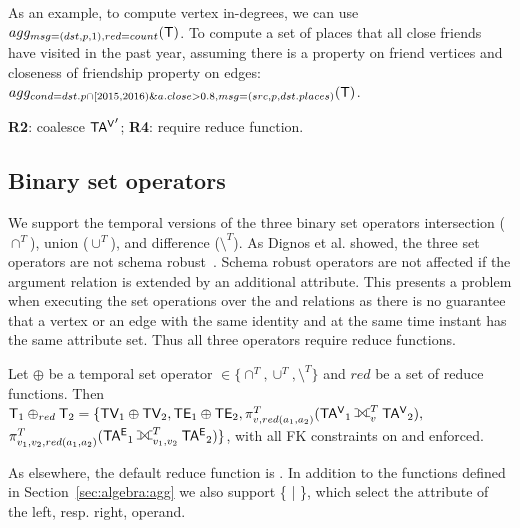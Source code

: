 As an example, to compute vertex in-degrees, we can use
$agg_{msg=(dst,p,1),red=count}(\mathsf{T})$.  To compute a set of places
that all close friends have visited in the past year, assuming there
is a property  on friend vertices and closeness of
friendship property on edges:\\ $agg_{cond=dst.p \cap [2015,2016) \&
    a.close > 0.8,msg=(src,p,dst.places)}(\mathsf{T})$.

{\bf R2}: coalesce $\mathsf{TA^{V}}'$; {\bf R4}: require reduce function.


\subsection{Binary set operators}
\label{sec:algebra:binary}

We support the temporal versions of the three binary set operators
intersection ($\cap^T$), union ($\cup^T$), and difference
($\setminus^T$).  As Dignos et al. showed, the three set operators are
not schema robust~\cite{Dignos2012}.  Schema robust operators are not
affected if the argument relation is extended by an additional
attribute.  This presents a problem when executing the set operations
over the \tav and \tae relations as there is no guarantee that a
vertex or an edge with the same identity and at the same time instant
has the same attribute set.  Thus all three operators require reduce
functions.

Let $\oplus$ be a temporal set operator $\in \{ \cap^T, \cup^T,
\setminus^T \}$ and $red$ be a set of reduce functions.  Then $\tve_1
\oplus_{red} \tve_2 = \{ \tv_1 \oplus \tv_2, \te_1 \oplus \te_2,
\pi^T_{v,red(a_1,a_2)}(\tav_1 \fullouterjoin^T_{v}
\tav_2),$\\ $\pi^T_{v_1,v_2,red(a_1,a_2)}(\tae_1
\fullouterjoin^T_{v_1,v_2} \tae_2) \}$, with all FK constraints on
\tav and \tae enforced.

As elsewhere, the default reduce function is .  In addition
to the functions defined in Section~\ref{sec:algebra:agg} we also
support \{  |  \}, which select the attribute
of the left, resp. right, operand.

